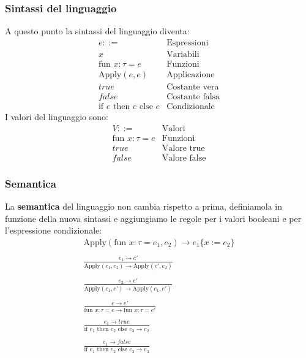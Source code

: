 \subsubsection{Sintassi del linguaggio}
A questo punto la sintassi del linguaggio diventa:
\[
	\begin{array}{lr}
		e ::=                                        & \text{Espressioni}    \\
		x                                            & \text{Variabili}      \\
		\text{fun } x : \tau = e                     & \text{Funzioni}       \\
		\text{Apply} (e, e)                          & \text{Applicazione}   \\
		true                                         & \text{Costante vera}  \\
		false                                        & \text{Costante falsa} \\
		\text{if } e \text{ then } e \text{ else } e & \text{Condizionale}
	\end{array}
\]
I valori del linguaggio sono:
\[
	\begin{array}{lr}
		V ::=                    & \text{Valori}       \\
		\text{fun } x : \tau = e & \text{Funzioni}     \\
		true                     & \text{Valore true}  \\
		false                    & \text{Valore false}
	\end{array}
\]

\subsubsection{Semantica}
La \textbf{semantica} del linguaggio non cambia rispetto a prima, definiamola in funzione della nuova sintassi e aggiungiamo
le regole per i valori booleani e per l'espressione condizionale:
\begin{gather*}
	\text{Apply}(\text{fun } x : \tau = e_1, e_2) \rightarrow e_1 \{ x := e_2 \} \\
	\\
	\frac{e_1 \rightarrow e'}{\text{Apply}(e_1, e_2) \rightarrow \text{Apply}(e', e_2)} \\
	\\
	\frac{e_2 \rightarrow e'}{\text{Apply}(e_1, e') \rightarrow \text{Apply}(e_1, e')} \\
	\\
	\frac{e \rightarrow e'}{\text{fun } x : \tau = e \rightarrow \text{fun } x : \tau = e'} \\
	\\
	\frac{e_1 \rightarrow true}{\text{if } e_1 \text{ then } e_2 \text{ else } e_3 \rightarrow e_2} \\
	\\
	\frac{e_1 \rightarrow false}{\text{if } e_1 \text{ then } e_2 \text{ else } e_3 \rightarrow e_3} \\
\end{gather*}

